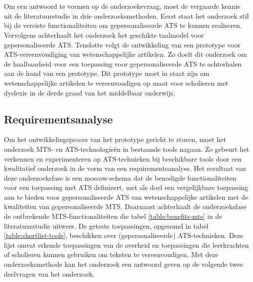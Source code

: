 
\chapter{}%
\label{ch:methodologie}


Om een antwoord te vormen op de onderzoeksvraag, moet de vergaarde kennis uit de literatuurstudie in drie onderzoeksmethoden. Eerst staat het onderzoek stil bij de vereiste functionaliteiten om gepersonaliseerde ATS te kunnen realiseren. Vervolgens achterhaalt het onderzoek het geschikte taalmodel voor gepersonaliseerde ATS. Tenslotte volgt de ontwikkeling van een prototype voor ATS-vereenvoudiging van wetenschappelijke artikelen. Zo doelt dit onderzoek om de haalbaarheid voor een toepassing voor gepersonaliseerde ATS te achterhalen aan de hand van een prototype. Dit prototype moet in staat zijn om wetenschappelijke artikelen te vereenvoudigen op maat voor scholieren met dyslexie in de derde graad van het middelbaar onderwijs.

\section{Requirementsanalyse}
\label{sec:requirementsanalyse}

Om het ontwikkelingsproces van het prototype gericht te sturen, moet het onderzoek MTS- en ATS-technologieën in bestaande tools nagaan. Zo gebeurt het verkennen en experimenteren op ATS-technieken bij beschikbare tools door een kwalitatief onderzoek in de vorm van een requirementsanalyse. Het resultaat van deze onderzoeksfase is een moscow-schema dat de benodigde functionaliteiten voor een toepassing met ATS definieert, met als doel een vergelijkbare toepassing aan te bieden voor gepersonaliseerde ATS van wetenschappelijke artikelen met de kwaliteiten van gepersonaliseerde MTS. Daarnaast achterhaalt de onderzoeksfase de ontbrekende MTS-functionaliteiten die tabel \ref{table:benefits-mts} in de literatuurstudie uitwees. De geteste toepassingen, opgesomd in tabel \ref{table:shortlist-tools}, beschikken over (gepersonaliseerde) ATS-technieken. Deze lijst omvat erkende toepassingen van de overheid en toepassingen die leerkrachten of scholieren kunnen gebruiken om teksten te vereenvoudigen. Met deze onderzoeksmethode kan het onderzoek een antwoord geven op de volgende twee deelvragen van het onderzoek.

